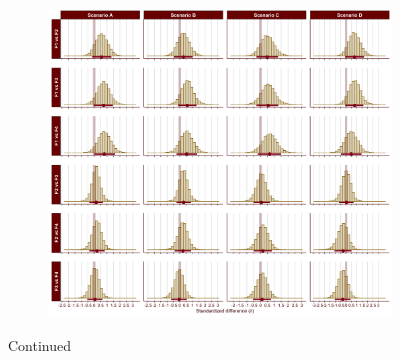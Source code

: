 \begin{appendix}
\medskip

\begin{figure}[ht]\ContinuedFloat
    \centering
    \begin{subfigure}{1\textwidth}
        \includegraphics[width=\linewidth]{Figures/SC2_first_scenario_comparisons_B.png}
        \label{fig:first-scenario-comparisons-B}
    \end{subfigure}
    \caption[]{Continued}
\end{figure}

\medskip


\end{appendix}
